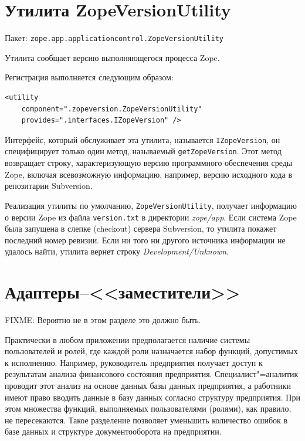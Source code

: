 \documentclass[a4paper,openany,twoside,final]{book}
\providecommand*{\DUroletitlereference}[1]{\textsl{#1}}
\begin{document}
\section{Утилита ZopeVersionUtility%
  \label{zopeversionutility}%
}

Пакет: \texttt{zope.app.applicationcontrol.ZopeVersionUtility}

Утилита сообщает версию выполняющегося процесса Zope.

Регистрация выполняется следующим образом:

\begin{verbatim}
<utility
    component=".zopeversion.ZopeVersionUtility"
    provides=".interfaces.IZopeVersion" />
\end{verbatim}

Интерфейс, который обслуживает эта утилита, называется \texttt{IZopeVersion}, он специфицирует только один метод, называемый \texttt{getZopeVersion}.  Этот метод возвращает строку, характеризующую версию программного обеспечения среды Zope, включая всевозможную информацию, например, версию исходного кода в репозитарии Subversion.

Реализация утилиты по умолчанию, \texttt{ZopeVersionUtility}, получает информацию о версии Zope из файла \texttt{version.txt} в директории \DUroletitlereference{zope/app}.  Если система Zope была запущена в слепке (checkout) сервера Subversion, то утилита покажет последний номер ревизии.  Если ни того ни другого источника информации не удалось найти, утилита вернет строку \DUroletitlereference{Development/Unknown}.

\section{Адаптеры--<<заместители>>}
\label{sec:proxyadapters}

FIXME: Вероятно не в этом разделе это должно быть.

Практически в любом приложении предполагается наличие системы пользователей и ролей, где каждой роли назначается набор функций, допустимых к исполнению.  Например, руководитель предприятия получает доступ к результатам анализа финансового состояния предприятия.  Специалист"=аналитик проводит этот анализ на основе данных базы данных предприятия, а работники имеют право вводить данные в базу данных согласно структуру предприятия.  При этом множества функций, выполняемых пользователями (ролями), как правило, не пересекаются.  Такое разделение позволяет уменьшить количество ошибок в базе данных и структуре документооборота на предприятии.
\end{document}
